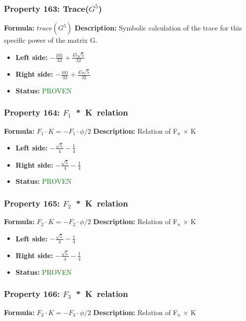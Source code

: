 \subsubsection*{Property 163: Trace($G^{5}$)}
\textbf{Formula:} $trace(G^5)$
\textbf{Description:} Symbolic calculation of the trace for this specific power of the matrix G.

\begin{itemize}
\item \textbf{Left side:} $- \frac{101}{32} + \frac{45 \sqrt{5}}{32}$
\item \textbf{Right side:} $- \frac{101}{32} + \frac{45 \sqrt{5}}{32}$
\item \textbf{Status:} \textcolor{green}{PROVEN}
\end{itemize}

\subsubsection*{Property 164: $F_{1}$~*~K~relation}
\textbf{Formula:} $F_1 \cdot K = -F_1 \cdot \phi/2$
\textbf{Description:} Relation of F$_n$ $\times$ K

\begin{itemize}
\item \textbf{Left side:} $- \frac{\sqrt{5}}{4} - \frac{1}{4}$
\item \textbf{Right side:} $- \frac{\sqrt{5}}{4} - \frac{1}{4}$
\item \textbf{Status:} \textcolor{green}{PROVEN}
\end{itemize}

\subsubsection*{Property 165: $F_{2}$~*~K~relation}
\textbf{Formula:} $F_2 \cdot K = -F_2 \cdot \phi/2$
\textbf{Description:} Relation of F$_n$ $\times$ K

\begin{itemize}
\item \textbf{Left side:} $- \frac{\sqrt{5}}{4} - \frac{1}{4}$
\item \textbf{Right side:} $- \frac{\sqrt{5}}{4} - \frac{1}{4}$
\item \textbf{Status:} \textcolor{green}{PROVEN}
\end{itemize}

\subsubsection*{Property 166: $F_{3}$~*~K~relation}
\textbf{Formula:} $F_3 \cdot K = -F_3 \cdot \phi/2$
\textbf{Description:} Relation of F$_n$ $\times$ K

